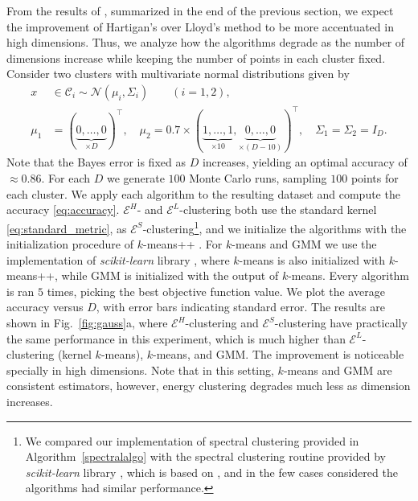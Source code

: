 \documentclass[aps,preprint,nofootinbib,floatfix]{revtex4-1}
\newcommand\C{{\mathcal{C}}}
\begin{document}
From the results of \cite{Telgarsky}, summarized in the end of the previous
section, we expect the improvement of Hartigan's 
over Lloyd's method to be more accentuated in high dimensions.
Thus, we analyze
how the algorithms degrade as the number of dimensions increase while
keeping the number of points in each cluster fixed.
Consider
two clusters with multivariate normal distributions given by
\begin{equation}
\label{eq:gauss1}
\begin{split}
x &\in \C_i  \sim 
\mathcal{N}(\mu_i,\Sigma_i) \qquad (i=1,2),  \\
\mu_1 &= (\underbrace{0,\dotsc,0}_{\times D})^\top , \quad
\mu_2 = 0.7 \times (\underbrace{1,\dots,1}_{\times 10},
\underbrace{0,\dots,0}_{\times (D-10)})^\top, \quad
\Sigma_1 = \Sigma_2 = I_D.
\end{split}
\end{equation}
Note that the Bayes error
is fixed as $D$ increases, yielding an optimal 
accuracy of $\approx 0.86$.
For each $D$ we generate $100$ Monte Carlo runs, 
sampling $100$ points for each cluster.
We apply each algorithm to the resulting dataset 
and compute the accuracy \eqref{eq:accuracy}.
$\mathcal{E}^H$- and $\mathcal{E}^L$-clustering
both use the standard
kernel \eqref{eq:standard_metric}, as $\mathcal{E}^S$-clustering\footnote{We
compared our implementation of spectral clustering provided in
Algorithm~\ref{spectralalgo} with the spectral clustering routine provided
by \emph{scikit-learn} library \cite{scikit-learn}, 
which is based on \cite{Malik}, and in the few
cases considered the algorithms had similar performance.}, 
and we initialize the algorithms
with the initialization procedure of $k$-means++ \cite{Vassilvitskii}.
For $k$-means and GMM we use the implementation of \emph{scikit-learn} library
\cite{scikit-learn}, where $k$-means is also initialized with $k$-means++,
while GMM is initialized with the output of $k$-means. Every algorithm
is ran $5$ times, picking the best objective function value.
We plot the average accuracy versus $D$, with error bars indicating
standard error.
The results are shown in Fig.~\ref{fig:gauss}a, where 
$\mathcal{E}^H$-clustering and $\mathcal{E}^S$-clustering have practically
the same performance in this experiment, which is 
much higher than $\mathcal{E}^L$-clustering (kernel
$k$-means), $k$-means, and GMM. The improvement is noticeable 
specially in high dimensions.
Note that in this setting, $k$-means and GMM are consistent estimators,
however, energy clustering degrades much less as dimension increases.
\end{document}
